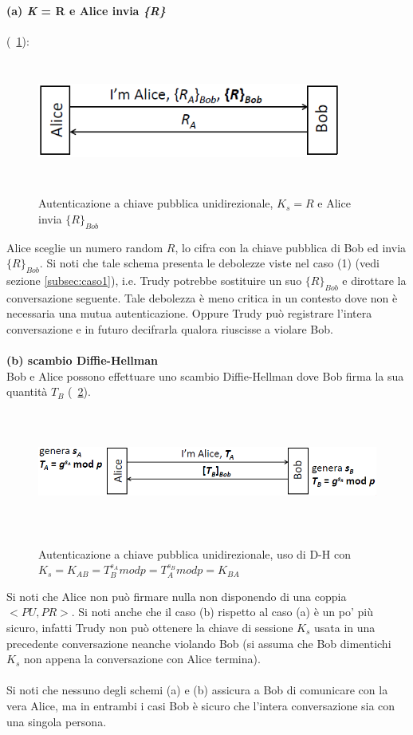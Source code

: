 \paragraph{(a) \textit{K} = R e Alice invia \textit{\{R\}}} (\figurename~\ref{fig:ImgS81bis}): 
\begin{figure}[htbp]
	\centering%
	\subfigure%
	{\includegraphics[height=4cm, width=10cm, keepaspectratio]{Immagini/autenticazione/ImgS81bis.png}}
	\caption{Autenticazione a chiave pubblica unidirezionale, $K_{s} = R$ e Alice invia $\lbrace R\rbrace_{Bob}$}\label{fig:ImgS81bis} 	
\end{figure}
Alice sceglie un numero random $R$, lo cifra con la chiave pubblica di Bob ed invia $\lbrace R\rbrace_{Bob}$. Si noti che tale schema presenta le debolezze viste nel caso (1) (vedi sezione \ref{subsec:caso1}), i.e. Trudy potrebbe sostituire un suo $\lbrace R\rbrace_{Bob}$ e dirottare la conversazione seguente. Tale debolezza è meno critica in un contesto dove non è necessaria una mutua autenticazione. Oppure Trudy può registrare l'intera conversazione e in futuro decifrarla qualora riuscisse a violare Bob.\\ \\
\textbf{(b) scambio Diffie-Hellman} \\
Bob e Alice possono effettuare uno scambio Diffie-Hellman dove Bob firma la sua quantità $T_{B}$ (\figurename~\ref{fig:ImgS82bis}).
\begin{figure}[htbp]
	\centering%
	\subfigure%
	{\includegraphics[height=4cm, width=12cm, keepaspectratio]{Immagini/autenticazione/ImgS82bis.png}}
	\caption{Autenticazione a chiave pubblica unidirezionale, uso di D-H con $K_{s} = K_{AB} = T_{B}^{s_{A}}modp = T_{A}^{s_{B}}modp = K_{BA}$}\label{fig:ImgS82bis} 	
\end{figure}
Si noti che Alice non può firmare nulla non disponendo di una coppia $<PU, PR>$. Si noti anche che il caso (b) rispetto al caso (a) è un po' più sicuro, infatti Trudy non può ottenere la chiave di sessione $K_{s}$ usata in una precedente conversazione neanche violando Bob (si assuma che Bob dimentichi $K_{s}$ non appena la conversazione con Alice termina).\\ \\
Si noti che nessuno degli schemi (a) e (b) assicura a Bob di comunicare con la vera Alice,  ma in entrambi i casi Bob è sicuro che l'intera conversazione sia con una singola persona.
